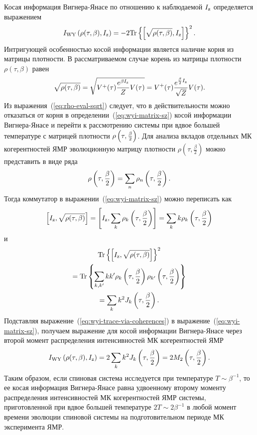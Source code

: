 Косая информация Вигнера-Янасе по отношению к наблюдаемой $I_\mathrm{z}$ определяется выражением~\cite{Wigner1963}
%
\begin{equation}\label{eq:wyi-matrix-sz}
  I_\mathrm{WY}\left( \rho(\tau,\beta),I_\mathrm{z} \right)
  = -2 \mathrm{Tr} \left\{ \left[\sqrt{\rho(\tau,\beta)}, I_\mathrm{z}\right] \right\}^2.
\end{equation}
%
Интригующей особенностью косой информации
является наличие корня из матрицы плотности.
В рассматриваемом случае корень из матрицы плотности $\rho(\tau,\beta)$ равен
%
\begin{equation}\label{eq:rho-eval-sqrt}
  \sqrt{\rho(\tau,\beta)}
  = \sqrt{V^+(\tau)\frac{e^{\beta I_\mathrm{z}}}{Z}V(\tau)}
  = V^+(\tau) \frac{e^{\frac{\beta}{2}I_\mathrm{z}}}{\sqrt{Z}}V(\tau).
\end{equation}
%
Из выражения~(\ref{eq:rho-eval-sqrt}) следует,
что в действительности можно отказаться от корня
в определении~(\ref{eq:wyi-matrix-sz}) косой информации Вигнера-Янасе
и перейти к рассмотрению системы при вдвое большей температуре
с матрицей плотности $\rho\left( \tau,\frac \beta 2 \right)$.
Для анализа вкладов отдельных МК когерентностей ЯМР эволюционную матрицу плотности
$\rho(\tau,\frac \beta 2)$ можно представить в виде ряда~\cite{Feldman1996}
%
\begin{equation}
  \rho\left( \tau,\frac \beta 2 \right) = \sum_n \rho_{n}\left( \tau,\frac \beta 2 \right).
\end{equation}
%
Тогда коммутатор в выражении~(\ref{eq:wyi-matrix-sz}) можно переписать как
%
\begin{equation}
    \left[I_\mathrm{z}, \sqrt{\rho(\tau,\beta)}\right]
    = \left[I_\mathrm{z}, \sum_k \rho_k \left( \tau, \frac{\beta}{2} \right)\right]
    = \sum_k k\rho_k \left( \tau, \frac{\beta}{2} \right)
\end{equation}
%
и
%
\begin{multline}\label{eq:wyi-trace-via-coherences}
  \mathrm{Tr} \left\{ \left[I_\mathrm{z}, \sqrt{\rho(\tau,\beta)}\right] \right\}^2
  \\
  = \mathrm{Tr} \left\{ 
    \sum_{k,k'}kk'
    \rho_k\left( \tau,\frac{\beta}{2} \right)
    \rho_{k'}\left( \tau,\frac{\beta}{2} \right)
   \right\}
  \\
  = \sum_k k^2 J_k\left( \tau,\frac{\beta}{2} \right).
\end{multline}
%
Подставляя выражение~(\ref{eq:wyi-trace-via-coherences}) в выражение~(\ref{eq:wyi-matrix-sz}),
получаем выражение для косой информации Вигнера-Янасе
через второй момент распределения интенсивностей МК когерентностей ЯМР
%
\begin{equation}\label{eq:wyi-via-second-moment}
    I_\mathrm{WY}\left( \rho(\tau, \beta), I_\mathrm{z} \right)
    = 2\sum_k k^2 J_k\left( \tau, \frac{\beta}{2} \right)
    = 2M_2\left( \tau, \frac{\beta}{2} \right).
\end{equation}
%
Таким образом,
если спиновая система исследуется при температуре $T\sim\beta^{-1}$,
то ее косая информация Вигнера-Янасе равна удвоенному второму моменту
распределения интенсивностей  МК когерентностей ЯМР системы, приготовленной при вдвое большей температуре $2T \sim 2\beta^{-1}$
в любой момент времени эволюции спиновой системы на подготовительном периоде МК эксперимента ЯМР.


